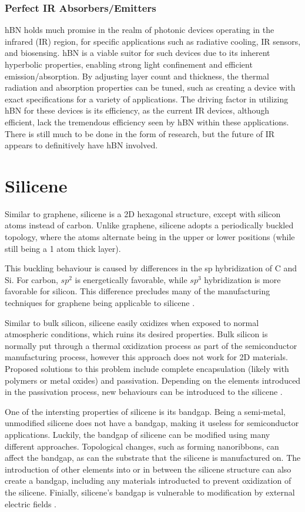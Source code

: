 \documentclass[conference]{IEEEtran}
\begin{document}
  \subsubsection{Perfect IR Absorbers/Emitters}

hBN holds much promise in the realm of photonic devices operating in the infrared (IR) region, for specific applications such as radiative cooling, IR sensors, and biosensing. hBN is a viable suitor for such devices due to its inherent hyperbolic properties, enabling strong light confinement and efficient emission/absorption. By adjusting layer count and thickness, the thermal radiation and absorption properties can be tuned, such as creating a device with exact specifications for a variety of applications. The driving factor in utilizing hBN for these devices is its efficiency, as the current IR devices, although efficient, lack the tremendous efficiency seen by hBN within these applications. There is still much to be done in the form of research, but the future of IR appears to definitively have hBN involved.

\section{Silicene}

Similar to graphene, silicene is a 2D hexagonal structure, except with silicon atoms instead of carbon. Unlike graphene, silicene adopts a periodically buckled topology, where the atoms alternate being in the upper or lower positions (while still being a 1 atom thick layer).

This buckling behaviour is caused by differences in the sp hybridization of C and Si. For carbon, $sp^2$ is energetically favorable, while $sp^3$ hybridization is more favorable for silicon. This difference precludes many of the manufacturing techniques for graphene being applicable to silicene \cite{b13}.

Similar to bulk silicon, silicene easily oxidizes when exposed to normal atmospheric conditions, which ruins its desired properties. Bulk silicon is normally put through a thermal oxidization process as part of the semiconductor manufacturing process, however this approach does not work for 2D materials. Proposed solutions to this problem include complete encapsulation (likely with polymers or metal oxides) and passivation. Depending on the elements introduced in the passivation process, new behaviours can be introduced to the silicene \cite{b14}.

One of the intersting properties of silicene is its bandgap. Being a semi-metal, unmodified silicene does not have a bandgap, making it useless for semiconductor applications. Luckily, the bandgap of silicene can be modified using many different approaches. Topological changes, such as forming nanoribbons, can affect the bandgap, as can the substrate that the silicene is manufactured on. The introduction of other elements into or in between the silicene structure can also create a bandgap, including any materials introducted to prevent oxidization of the silicene. Finially, silicene's bandgap is vulnerable to modification by external electric fields \cite{b14}.
\end{document}
